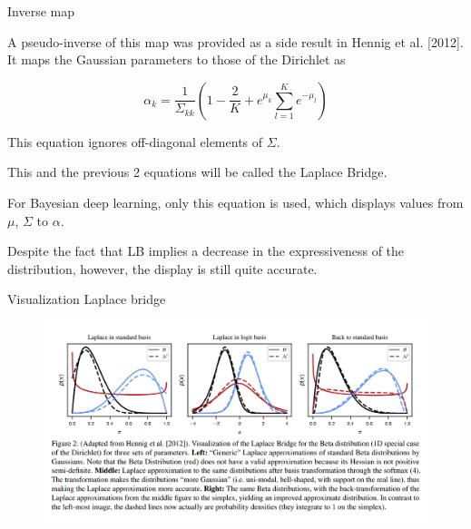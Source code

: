 \documentclass{beamer}
\begin{document}
\begin{frame}{Inverse map}

A pseudo-inverse of this map was provided as a side result
in Hennig et al. [2012]. It maps the Gaussian parameters to
those of the Dirichlet as

\begin{equation}
\alpha_k = \frac{1}{\Sigma_{kk}} \left( 1 - \frac{2}{K} + e^{\mu_k} \sum_{l=1}^{K} e^{-\mu_l} \right)
\end{equation}

This equation ignores off-diagonal elements of $\Sigma$.

This and the previous 2 equations will be called the Laplace Bridge. 

For Bayesian deep learning, only this equation is used, which displays values from $\mu$, $\Sigma$ to $\alpha$.

Despite the fact that LB implies a decrease
in the expressiveness of the distribution, however, the display is still quite accurate.

\end{frame}


\begin{frame}{Visualization Laplace bridge }     
    \begin{figure}
        \centering
        \includegraphics[width=1.0\textwidth]{figs/beta.png} %
    \end{figure}
\end{frame}

\end{document}
